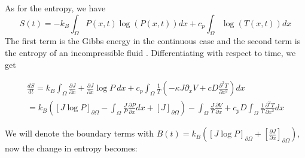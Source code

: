 As for the entropy, we have \cite{Streater1997a}
\begin{equation}
S(t) = -k_B \int_{\Omega} P(x, t) \log(P(x, t)) dx + c_p \int_{\Omega} \log(T(x, t))dx
\end{equation}
The first term is the Gibbs energy in the continuous case \cite{Jaynes1965} and the second term is the entropy of an incompressible fluid \cite{CengelBoles1994}.
Differentiating with respect to time, we get

\begin{align}
\frac{d S}{d t} =  k_B \int_{\Omega} \frac{\partial J}{\partial x} + \frac{\partial J}{\partial x} \log P \ dx + c_p \int_{\Omega} \frac{1}{T} \left(-\kappa J \partial_x V + c D \frac{\partial^2 T}{\partial x^2} \right) dx \\
                     = k_B \left ( [J \log P]_{\partial \Omega} - \int_{\Omega} \frac{J}{P} \frac{\partial P}{\partial x} dx + [J]_{\partial \Omega} \right) - \int_{\Omega} \frac{J}{T} \frac{\partial V}{\partial x} + c_p D \int_{\Omega} \frac{1}{T} \frac{\partial^2 T}{\partial x^2} dx
\end{align}

We will denote the boundary terms with $B(t) = k_B( [J \log P]_{\partial \Omega} + \left[\frac{\partial J}{\partial x} \right]_{\partial \Omega} ) $, now the change in entropy becomes:

